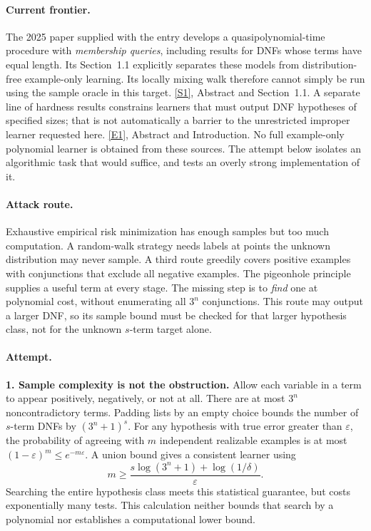 \documentclass[11pt,a4paper]{article}
\newcommand{\eps}{\varepsilon}
\newcommand{\sref}[2]{\hyperlink{source:#1:#2}{[S#2]}}
\newcommand{\eref}[2]{\hyperlink{extra:#1:#2}{[E#2]}}
\numberwithin{equation}{section}
\begin{document}
\paragraph{Current frontier.}
The 2025 paper supplied with the entry develops a quasipolynomial-time
procedure with \emph{membership queries}, including results for DNFs whose
terms have equal length. Its Section~1.1 explicitly separates these models
from distribution-free example-only learning. Its locally mixing walk
therefore cannot simply be run using the sample oracle in this target.
\sref{statement}{1}, Abstract and Section~1.1.
A separate line of hardness results constrains learners that must output
DNF hypotheses of specified sizes; that is not automatically a barrier to
the unrestricted improper learner requested here. \eref{statement}{1}, Abstract
and Introduction. No full example-only polynomial learner is obtained from
these sources. The attempt below isolates an algorithmic task that would
suffice, and tests an overly strong implementation of it.

\paragraph{Attack route.}
Exhaustive empirical risk minimization has enough samples but too much
computation. A random-walk strategy needs labels at points the unknown
distribution may never sample. A third route greedily covers positive
examples with conjunctions that exclude all negative examples. The
pigeonhole principle supplies a useful term at every stage. The missing
step is to \emph{find} one at polynomial cost, without enumerating all
$3^n$ conjunctions. This route may output a larger DNF, so its sample
bound must be checked for that larger hypothesis class, not for the
unknown $s$-term target alone.

\paragraph{Attempt.}
\textbf{1. Sample complexity is not the obstruction.}
Allow each variable in a term to appear positively, negatively, or not at
all. There are at most $3^n$ noncontradictory terms. Padding lists by an
empty choice bounds the number of $s$-term DNFs by $(3^n+1)^s$.
For any hypothesis with true error greater than $\eps$, the probability
of agreeing with $m$ independent realizable examples is at most
$(1-\eps)^m\le e^{-m\eps}$. A union bound gives a consistent learner
using
\[
 m\ge\frac{s\log(3^n+1)+\log(1/\delta)}{\eps}.
\]
Searching the entire hypothesis class meets this statistical guarantee,
but costs exponentially many tests. This calculation neither bounds that
search by a polynomial nor establishes a computational lower bound.
\end{document}
